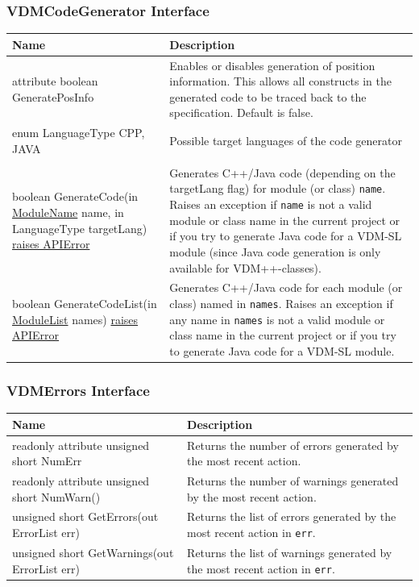 \documentclass[\pformat,12pt]{article}
\newcommand{\pbs}[1]{\let\temp=\\#1\let\\=\temp}
\newenvironment{interfacetable}{%
  \begin{longtable}{|>{\pbs\raggedright\ttfamily}p{6.6cm}%
                    |>{\pbs\raggedright}p{6.6cm}|} \hline
  \textrm{\bfseries Name} &  \textbf{Description} \\ \hline
  \endhead
  }{\end{longtable}}
\newcommand{\APIError}{\hyperlink{exception.APIError}{raises APIError}}
\newcommand{\ModuleName}{\hyperlink{type.ModuleName}{ModuleName}}
\newcommand{\ModuleList}{\hyperlink{type.ModuleList}{ModuleList}}
\begin{document}
\subsubsection{VDMCodeGenerator Interface}
\mbox{}
\begin{interfacetable}
attribute boolean GeneratePosInfo
  & Enables or disables generation of position information. This
    allows all constructs in the generated code to be traced back to
    the specification. Default is \textsf{false}. 
\\ \hline
enum LanguageType {CPP, JAVA}
  & Possible target languages of the code generator\\
\\ \hline
boolean GenerateCode(in {\ModuleName} name, in LanguageType targetLang) \APIError
  & Generates C++/Java code (depending on the targetLang flag) for module (or class) \texttt{name}.
    Raises an exception if \texttt{name} is not a valid module or
    class name in the current project or if you try to generate Java code
    for a VDM-SL module (since Java code generation is only available
    for VDM++-classes). 
\\ \hline
boolean GenerateCodeList(in {\ModuleList} names) \APIError
  & Generates C++/Java code for each module (or class) named in
    \texttt{names}. 
    Raises an exception if any name in \texttt{names} is not a valid
    module or class name in the current project or if you try to generate
    Java code for a VDM-SL module.

\\ \hline
\end{interfacetable}

\subsubsection{VDMErrors Interface}
\mbox{}
\begin{interfacetable}
readonly attribute unsigned short NumErr
                                        & Returns the number of errors 
                                          generated by the most recent
                                          action.
\\ \hline
readonly attribute unsigned short NumWarn()
                                        & Returns the number of
                                          warnings generated by the
                                          most recent action.
\\ \hline
unsigned short GetErrors(out ErrorList err)  
                                        & Returns the list of errors
                                          generated by the most recent
                                          action in \texttt{err}.
\\ \hline
unsigned short GetWarnings(out ErrorList err)
                                        & Returns the list of warnings
                                          generated by the most recent
                                          action in \texttt{err}.
\\ \hline
\end{interfacetable}
\end{document}
